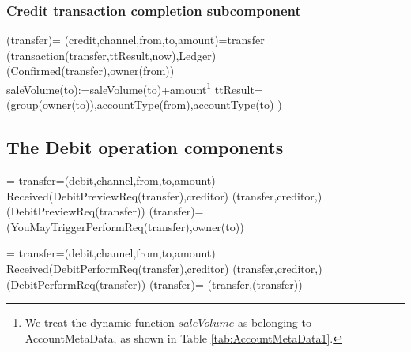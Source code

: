 \subsubsection{Credit transaction completion subcomponent}
 \begin{asm}
 	(transfer)=\+  
 	\LET (credit,channel,from,to,amount)=transfer \\ 
 	(transaction(transfer,ttResult,now),Ledger)\\
 	(Confirmed(transfer),\TO owner(from))\\
 	saleVolume(to):=saleVolume(to)+amount\footnote{We treat the dynamic function $saleVolume$ as belonging to AccountMetaData, as shown in Table \ref{tab:AccountMetaData1}.} \-
 	\WHERE \+
 	ttResult= (group(owner(to)),accountType(from),accountType(to) )
 \end{asm}
 
 \subsection{The Debit operation components}
 

\begin{asm}
	  =\+
	\LET transfer=(debit,channel,from,to,amount)\\
	\IF Received(DebitPreviewReq(transfer),\FROM creditor) \THEN \+   
	(transfer,creditor,)\\
	(DebitPreviewReq(transfer)) \dec\-
	\WHERE \+
	(transfer)=\+
	  (YouMayTriggerPerformReq(transfer),\TO  owner(to)) 
\end{asm}
 

\begin{asm}
	  =\+
	\LET 	transfer=(debit,channel,from,to,amount)\\
	\IF Received(DebitPerformReq(transfer),\FROM creditor) \THEN \+  
	(transfer,creditor,)\\
	(DebitPerformReq(transfer)) \dec\-
	\WHERE \+
	(transfer)=\+
	(transfer,(transfer))
\end{asm}

